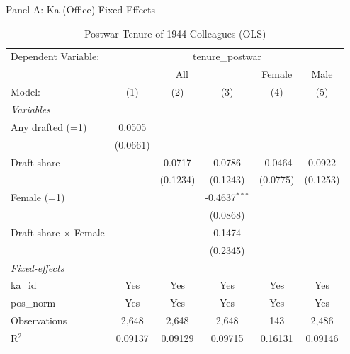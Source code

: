 \begin{table}[htbp]
\centering
\begin{threeparttable}
\caption{Postwar Tenure of 1944 Colleagues (OLS)}
\label{tab:tenure}
\small
Panel A: Ka (Office) Fixed Effects\\[1ex]
\begingroup
\centering
\begin{tabular}{lccccc}
   \tabularnewline \midrule \midrule
   Dependent Variable: & \multicolumn{5}{c}{tenure\_postwar}\\
    & \multicolumn{3}{c}{All} & Female & Male \\ 
   Model:                       & (1)      & (2)      & (3)             & (4)      & (5)\\  
   \midrule
   \emph{Variables}\\
   Any drafted (=1)             & 0.0505   &          &                 &          &   \\   
                                & (0.0661) &          &                 &          &   \\   
   Draft share                  &          & 0.0717   & 0.0786          & -0.0464  & 0.0922\\   
                                &          & (0.1234) & (0.1243)        & (0.0775) & (0.1253)\\   
   Female (=1)                  &          &          & -0.4637$^{***}$ &          &   \\   
                                &          &          & (0.0868)        &          &   \\   
   Draft share $\times$ Female  &          &          & 0.1474          &          &   \\   
                                &          &          & (0.2345)        &          &   \\   
   \midrule
   \emph{Fixed-effects}\\
   ka\_id                       & Yes      & Yes      & Yes             & Yes      & Yes\\  
   pos\_norm                    & Yes      & Yes      & Yes             & Yes      & Yes\\  
   \midrule
   Observations                 & 2,648    & 2,648    & 2,648           & 143      & 2,486\\  
   R$^2$                        & 0.09137  & 0.09129  & 0.09715         & 0.16131  & 0.09146\\  
   \midrule \midrule
\end{tabular}

\end{threeparttable}
\end{table}
